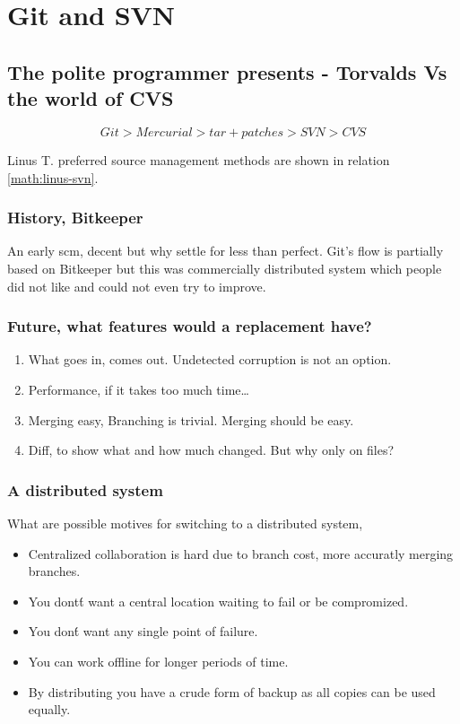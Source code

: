 
\section{Git and SVN}

\subsection{The polite programmer presents - Torvalds Vs the world of CVS}

\[
Git >  Mercurial > tar+patches > SVN > CVS
\label{math:linus-svn}
\]

Linus T. preferred source management methods are shown in relation \ref{math:linus-svn}.


\subsubsection{History, Bitkeeper}
An early scm, decent but why settle for less than perfect.
Git's flow is partially based on Bitkeeper but this was commercially distributed system which people did not like and could not even try to improve.

\subsubsection{Future, what features would a replacement have?}

\begin{enumerate}
  \item What goes in, comes out. Undetected corruption is not an option.
  \item Performance, if it takes too much time\ldots
  \item Merging easy, Branching is trivial. Merging should be easy.
  \item Diff, to show what and how much changed. But why only on files?
\end{enumerate}

\subsubsection{A distributed system}
What are possible motives for switching to a distributed system,
\begin{itemize}
 \item Centralized collaboration is hard due to branch cost, more accuratly merging branches.
 \item You dont\'t want a central location waiting to fail or be compromized.
 \item You don\'t want any single point of failure.
 \item You can work offline for longer periods of time.
 \item By distributing you have a crude form of backup as all copies can be used equally.
\end{itemize}


